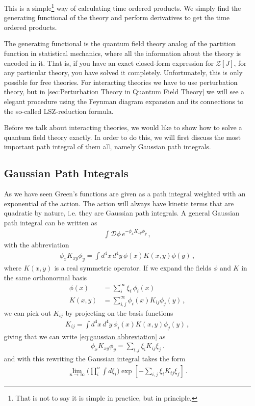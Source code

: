 This is a simple\footnote{That is not to say it is simple in practice, but in principle.} way of calculating time ordered products. We simply find the generating functional of the theory and perform derivatives to get the time ordered products.

The generating functional is the quantum field theory analog of the partition function in statistical mechanics, where all the information about the theory is encoded in it. That is, if you have an exact closed-form expression for $\mathcal{Z}[J]$, for any particular theory, you have solved it completely. Unfortunately, this is only possible for free theories. For interacting theories we have to use perturbation theory, but in \cref{sec:Perturbation Theory in Quantum Field Theory} we will see a elegant procedure using the Feynman diagram expansion and its connections to the so-called LSZ-reduction formula. 

Before we talk about interacting theories, we would like to show how to solve a quantum field theory exactly. In order to do this, we will first discuss the most important path integral of them all, namely Gaussian path integrals.

\subsection*{Gaussian Path Integrals}
As we have seen Green's functions are given as a path integral weighted with an exponential of the action. The action will always have kinetic terms that are quadratic by nature, i.e. they are Gaussian path integrals. A general Gaussian path integral can be written as
\begin{align}\label{eq:general gaussian path integral}
    \int\mathcal{D}\phi\,e^{-\phi_{x} K_{xy}\phi_{y}}\,,
\end{align}
with the abbreviation
\begin{align}\label{eq:gaussian abbreviation}
    \phi_{x}K_{xy}\phi_{y}=\int d^{4}x\,d^{4}y\,\phi(x)K(x,y)\phi(y)\,,
\end{align}
where $K(x,y)$ is a real symmetric operator. If we expand the fields $\phi$ and $K$ in the same orthonormal basis
\begin{align}
    \phi(x)&=\sum_{i}^{\infty}\xi_{i}\,\phi_{i}(x)
    \\
    K(x,y)&=\sum_{i,j}^{\infty}\phi_{i}(x)K_{ij}\phi_{j}(y)\,,
\end{align}
we can pick out $K_{ij}$ by projecting on the basis functions
\begin{align}
    K_{ij}=\int d^{4}x\,d^{4}y\,\phi_{i}(x)K(x,y)\phi_{j}(y)\,,
\end{align}
giving that we can write \cref{eq:gaussian abbreviation} as
\begin{align}
    \phi_{x}K_{xy}\phi_{y}=\sum_{i,j}\xi_{i}K_{ij}\xi_{j}\,.
\end{align}
and with this rewriting the Gaussian integral takes the form
\begin{align}
    \lim_{n\to\infty}\Big(\prod_{i}^{n}\int d\xi_{i}\Big)\exp[-\sum_{i,j}\xi_{i}K_{ij}\xi_{j}]\,.
\end{align}

